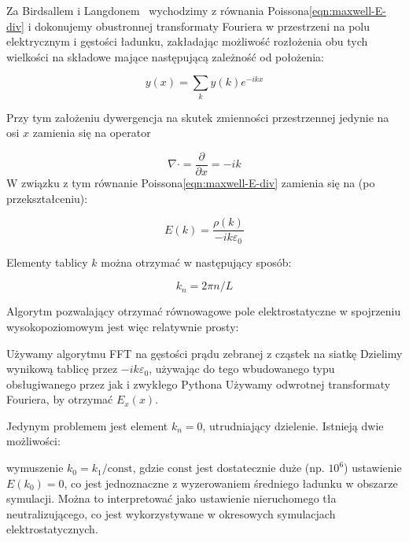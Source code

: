 Za Birdsallem i Langdonem~\cite{birdsall} wychodzimy z równania Poissona\ref{eqn:maxwell-E-div} i dokonujemy
obustronnej transformaty Fouriera w przestrzeni na polu elektrycznym i gęstości ładunku,
zakładając możliwość rozłożenia obu tych wielkości na składowe mające następującą zależność
od położenia:

\begin{equation}
y(x) = \sum_k y(k) e^{-i k x}
\label{eqn:fourier-decomposition}
\end{equation}

Przy tym założeniu dywergencja na skutek zmienności przestrzennej jedynie na osi $x$
zamienia się na operator

\begin{equation}
\nabla \cdot = \frac{\partial}{\partial x} = -ik
\end{equation}
W związku z tym równanie Poissona\ref{eqn:maxwell-E-div} zamienia się na (po przekształceniu):

\begin{equation}
    E(k) = \frac{\rho(k)}{-ik \varepsilon_0}
\end{equation}

Elementy tablicy $k$ można otrzymać w następujący sposób:

\begin{equation}
    k_n = 2 \pi n / L
\end{equation}


Algorytm pozwalający otrzymać równowagowe pole elektrostatyczne w spojrzeniu wysokopoziomowym jest więc relatywnie prosty:
\begin{enumerate}
\itemi{} Używamy algorytmu FFT na gęstości prądu zebranej z cząstek na siatkę
\itemi{} Dzielimy wynikową tablicę przez $-ik \varepsilon_0$, używając do tego wbudowanego typu  obsługiwanego przez  jak i zwykłego Pythona
\itemi{} Używamy odwrotnej transformaty Fouriera, by otrzymać $E_x(x)$.
\end{enumerate}

Jedynym problemem jest element $k_n = 0$, utrudniający dzielenie. Istnieją dwie możliwości:
\begin{itemize}
\itemi{} wymuszenie $k_0 = k_1 / \text{const}$, gdzie $\text{const}$ jest dostatecznie duże (np. $10^6$)
\itemi{} ustawienie $E(k_0) = 0$, co jest jednoznaczne z wyzerowaniem średniego ładunku w
obszarze symulacji. Można to interpretować jako ustawienie nieruchomego tła neutralizującego,
co jest wykorzystywane w okresowych symulacjach elektrostatycznych.
\end{itemize}
